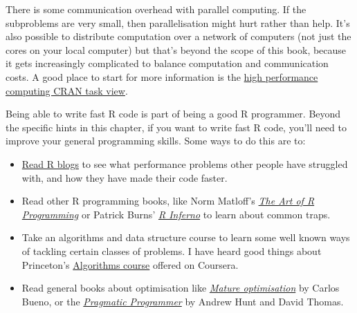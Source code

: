 \begin{Shaded}
\begin{Highlighting}[]
\StringTok{ }
\StringTok{ }

\NormalTok{)}
\CommentTok{#> [[1]]}
\end{Highlighting}
\end{Shaded}

There is some communication overhead with parallel computing. If the
subproblems are very small, then parallelisation might hurt rather than
help. It's also possible to distribute computation over a network of
computers (not just the cores on your local computer) but that's beyond
the scope of this book, because it gets increasingly complicated to
balance computation and communication costs. A good place to start for
more information is the
\href{http://cran.r-project.org/web/views/HighPerformanceComputing.html}{high
performance computing CRAN task view}.


Being able to write fast R code is part of being a good R programmer.
Beyond the specific hints in this chapter, if you want to write fast R
code, you'll need to improve your general programming skills. Some ways
to do this are to:

\begin{itemize}
\item
  \href{http://www.r-bloggers.com/}{Read R blogs} to see what
  performance problems other people have struggled with, and how they
  have made their code faster.
\item
  Read other R programming books, like Norm Matloff's
  \href{http://amazon.com/1593273843}{\emph{The Art of R Programming}}
  or Patrick Burns'
  \href{http://www.burns-stat.com/documents/books/the-r-inferno/}{\emph{R
  Inferno}} to learn about common traps.
\item
  Take an algorithms and data structure course to learn some well known
  ways of tackling certain classes of problems. I have heard good things
  about Princeton's
  \href{https://www.coursera.org/course/algs4partI}{Algorithms course}
  offered on Coursera.
\item
  Read general books about optimisation like
  \href{http://carlos.bueno.org/optimization/mature-optimization.pdf}{\emph{Mature
  optimisation}} by Carlos Bueno, or the
  \href{http://amazon.com/020161622X}{\emph{Pragmatic Programmer}} by
  Andrew Hunt and David Thomas.
\end{itemize}


